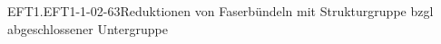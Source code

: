\begin{DEF}{EFT1.EFT1-1-02-63}{Reduktionen von Faserbündeln mit Strukturgruppe bzgl abgeschlossener Untergruppe}

\end{DEF}
